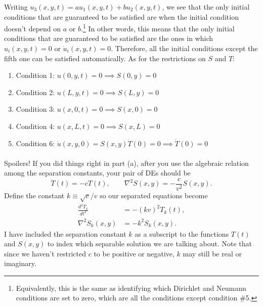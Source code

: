 \documentclass{article}
\begin{document}
\begin{solution}
	Writing $u_3(x, y, t) = a u_1(x, y, t) + bu_2(x, y, t)$, we see that the only initial conditions that 
	are guaranteed to be satisfied are when the initial condition doesn't depend on $a$ or $b$.\footnote{Equivalently, this is the same as identifying which Dirichlet and Neumann conditions 
	are set to zero, which are all the conditions except condition \#5.} In other 
	words, this means that the only initial conditions that are guaranteed to be satisfied are the 
	ones in which $u_i(x, y, t) = 0$ or $\dot u_i (x, y, t) = 0$. Therefore, all the initial conditions except
	the fifth one can be 
	satisfied automatically. As for the restrictions on $S$ and $T$:
	\begin{enumerate}[label=\alph*)]
		\item Condition 1: $u(0, y, t) = 0 \implies S(0, y) = 0$
		\item Condition 2: $u(L, y, t) = 0 \implies S(L, y) = 0$
		\item Condition 3: $u(x, 0, t) = 0 \implies S(x, 0) = 0$
		\item Condition 4: $u(x, L, t) = 0 \implies S(x, L) = 0$
		\item Condition 6: $\dot u(x, y, 0) = S(x, y) \dot T(0) = 0 \implies \dot T(0) = 0$
	\end{enumerate}
\end{solution}

\phline
\paragraph{}
Spoilers!  If you did things right in part (a), after you use the algebraic relation among the separation constants, your pair of DEs should be
	\begin{equation*}
		\ddot{T}(t) = -cT(t),	\qquad	\nabla^{2}S(x,y) = -\frac{c}{v^{2}}S(x,y).
	\end{equation*}
Define the constant $k\equiv \sqrt{c}/v$ so our separated equations become
	\begin{align}
		\frac{d^{2}T_{k}}{dt^{2}} &= -(kv)^{2}T_{k}(t),	\label{Tequation}\\	
		\nabla^{2}S_{k}(x,y) &= -k^{2}S_{k}(x,y).		\label{Sequation}
	\end{align}
I have included the separation constant $k$ as a subscript to the functions $T(t)$ and $S(x,y)$ to index which separable solution we are talking about.  Note that since we
haven't restricted $c$ to be positive or negative, $k$ may still be real or imaginary.
\end{document}
